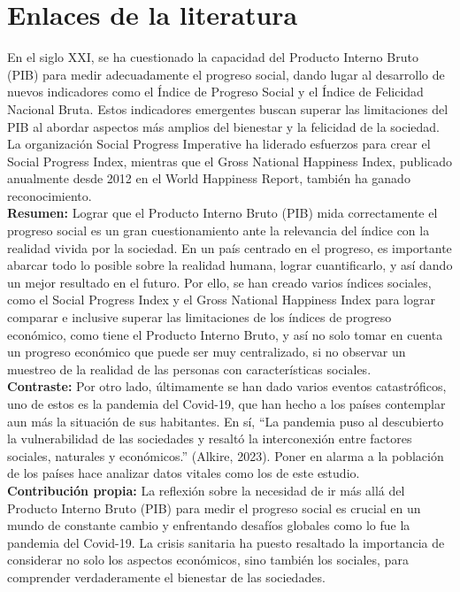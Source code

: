 \newpage
\section{Enlaces de la literatura}

En el siglo XXI, se ha cuestionado la capacidad del Producto Interno Bruto (PIB) para medir adecuadamente el progreso social, dando lugar al desarrollo de nuevos indicadores como el Índice de Progreso Social y el Índice de Felicidad Nacional Bruta. Estos indicadores emergentes buscan superar las limitaciones del PIB al abordar aspectos más amplios del bienestar y la felicidad de la sociedad. La organización Social Progress Imperative ha liderado esfuerzos para crear el Social Progress Index, mientras que el Gross National Happiness Index, publicado anualmente desde 2012 en el World Happiness Report, también ha ganado reconocimiento.\\

\textbf{Resumen:} Lograr que el Producto Interno Bruto (PIB) mida correctamente el progreso social es un gran cuestionamiento ante la relevancia del índice con la realidad vivida por la sociedad. En un país centrado en el progreso, es importante abarcar todo lo posible sobre la realidad humana,  lograr cuantificarlo, y así dando un mejor resultado en el futuro. Por ello, se han creado varios índices sociales, como el Social Progress Index y el Gross National Happiness Index para lograr comparar e inclusive superar las limitaciones de los índices de progreso económico, como tiene el Producto Interno Bruto, y así no solo tomar en cuenta un progreso económico que puede ser muy centralizado, si no observar un muestreo de la realidad de las personas con características sociales. \\

\textbf{Contraste:} Por otro lado, últimamente se han dado varios eventos catastróficos, uno de estos es la pandemia del Covid-19, que han hecho a los países contemplar aun más la situación de sus habitantes. En sí, ``La pandemia puso al descubierto la vulnerabilidad de las sociedades y resaltó la interconexión entre factores sociales, naturales y económicos.'' (Alkire, 2023). Poner en alarma a la población de los países hace analizar datos vitales como los de este estudio.\\

\textbf{Contribución propia:} La reflexión sobre la necesidad de ir más allá del Producto Interno Bruto (PIB) para medir el progreso social es crucial en un mundo de constante cambio y enfrentando desafíos globales como lo fue la pandemia del Covid-19. La crisis sanitaria ha puesto resaltado la importancia de considerar no solo los aspectos económicos, sino también los sociales, para comprender verdaderamente el bienestar de las sociedades. \\

